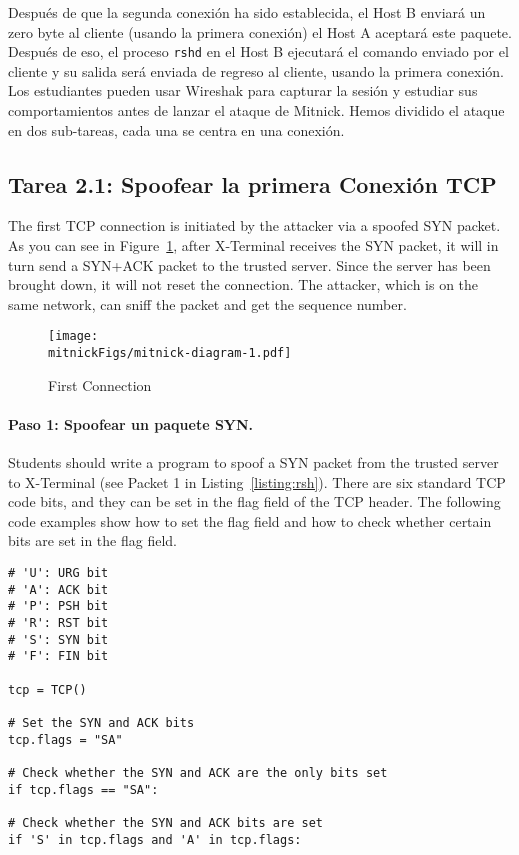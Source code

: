 Después de que la segunda conexión ha sido establecida, el Host B enviará un zero byte al cliente (usando la primera conexión) el Host A aceptará este paquete. Después de eso, el proceso  \texttt{rshd} en el Host B ejecutará el comando enviado por el cliente y su salida será enviada de regreso al cliente, usando la primera conexión.
Los estudiantes pueden usar Wireshak para capturar la sesión \rsh y estudiar sus comportamientos antes de lanzar el ataque de Mitnick.
Hemos dividido el ataque en dos sub-tareas, cada una se centra en una conexión.



\subsection{Tarea 2.1: Spoofear la primera Conexión TCP}
\label{sec:first-conn}

The first TCP connection is initiated by the attacker via a spoofed SYN packet. As you can see
in Figure~\ref{fig:first-conn}, after X-Terminal receives the SYN packet, it will in turn send
a SYN+ACK packet to the trusted server. Since the server has been brought down, it will not
reset the connection. The attacker, which is on the same network, can sniff the packet and get
the sequence number.

\begin{figure}[htb]
\centering
\texttt{[image: \\mitnickFigs/mitnick-diagram-1.pdf]}
\caption{First Connection}
\label{fig:first-conn}
\end{figure}


\paragraph{Paso 1: Spoofear un paquete SYN.}
Students should write a program to spoof a SYN packet 
from the trusted server to X-Terminal (see Packet 1 in Listing~\ref{listing:rsh}). 
There are six standard 
TCP code bits, and they can be set in the flag field of the TCP header. 
The following code examples show how to set the flag field
and how to check whether certain bits are set in
the flag field. 

\begin{lstlisting}
# 'U': URG bit
# 'A': ACK bit
# 'P': PSH bit
# 'R': RST bit
# 'S': SYN bit
# 'F': FIN bit

tcp = TCP()

# Set the SYN and ACK bits
tcp.flags = "SA"

# Check whether the SYN and ACK are the only bits set
if tcp.flags == "SA": 

# Check whether the SYN and ACK bits are set
if 'S' in tcp.flags and 'A' in tcp.flags: 
\end{lstlisting}

